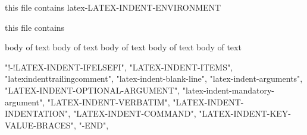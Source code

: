 
this file contains latex-LATEX-INDENT-ENVIRONMENT

this file contains

\begin{myenv}
	body of text
	body of text
	body of text
	body of text
	body of text
\end{myenv}
"!-!LATEX-INDENT-IFELSEFI",
"LATEX-INDENT-ITEMS",
"latexindenttrailingcomment",
"latex-indent-blank-line",
"latex-indent-arguments",
"LATEX-INDENT-OPTIONAL-ARGUMENT",
"latex-indent-mandatory-argument",
"LATEX-INDENT-VERBATIM",
"LATEX-INDENT-INDENTATION",
"LATEX-INDENT-COMMAND",
"LATEX-INDENT-KEY-VALUE-BRACES",
"-END",

